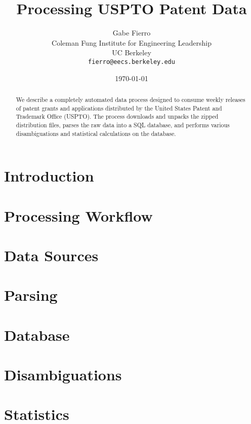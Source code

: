 \documentclass[11pt, twocolumn]{article}
\begin{document}
\title{Processing USPTO Patent Data}
\author{Gabe Fierro\\
	Coleman Fung Institute for Engineering Leadership\\
	UC Berkeley\\
	\texttt{fierro@eecs.berkeley.edu}}
\date{\today}
\maketitle

\begin{abstract}
We describe a completely automated data process designed to consume weekly releases of patent grants and applications distributed by the United States Patent and Trademark Office (USPTO). The process downloads and unpacks the zipped distribution files, parses the raw data into a SQL database, and performs various disambiguations and statistical calculations on the database.
\end{abstract}

\section{Introduction}

\section{Processing Workflow}

\section{Data Sources}

\section{Parsing}

\section{Database}

\section{Disambiguations}

\section{Statistics}


{
\scriptsize


}
\end{document}
